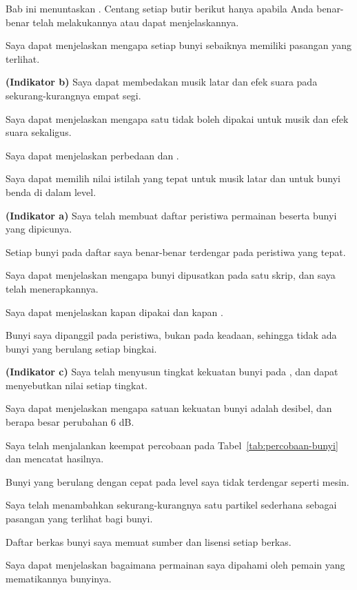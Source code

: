 
Bab ini menuntaskan . Centang setiap butir berikut hanya apabila
Anda benar-benar telah melakukannya atau dapat menjelaskannya.

\begin{checklistbox}
\begin{checklist}
  \item Saya dapat menjelaskan mengapa setiap bunyi sebaiknya memiliki pasangan
        yang terlihat.
  \item {\bfseries (Indikator b)} Saya dapat membedakan musik latar dan efek
        suara pada sekurang-kurangnya empat segi.
  \item Saya dapat menjelaskan mengapa satu  tidak boleh
        dipakai untuk musik dan efek suara sekaligus.
  \item Saya dapat menjelaskan perbedaan  dan
        .
  \item Saya dapat memilih nilai istilah  yang tepat
        untuk musik latar dan untuk bunyi benda di dalam level.
  \item {\bfseries (Indikator a)} Saya telah membuat daftar peristiwa permainan
        beserta bunyi yang dipicunya.
  \item Setiap bunyi pada daftar saya benar-benar terdengar pada peristiwa yang
        tepat.
  \item Saya dapat menjelaskan mengapa bunyi dipusatkan pada satu skrip, dan
        saya telah menerapkannya.
  \item Saya dapat menjelaskan kapan  dipakai dan kapan
        .
  \item Bunyi saya dipanggil pada peristiwa, bukan pada keadaan, sehingga tidak
        ada bunyi yang berulang setiap bingkai.
  \item {\bfseries (Indikator c)} Saya telah menyusun tingkat kekuatan bunyi
        pada , dan dapat menyebutkan nilai setiap tingkat.
  \item Saya dapat menjelaskan mengapa satuan kekuatan bunyi adalah desibel,
        dan berapa besar perubahan 6 dB.
  \item Saya telah menjalankan keempat percobaan pada
        Tabel~\ref{tab:percobaan-bunyi} dan mencatat hasilnya.
  \item Bunyi yang berulang dengan cepat pada level saya tidak terdengar
        seperti mesin.
  \item Saya telah menambahkan sekurang-kurangnya satu partikel sederhana
        sebagai pasangan yang terlihat bagi bunyi.
  \item Daftar berkas bunyi saya memuat sumber dan lisensi setiap berkas.
  \item Saya dapat menjelaskan bagaimana permainan saya dipahami oleh pemain
        yang mematikannya bunyinya.
\end{checklist}
\end{checklistbox}
